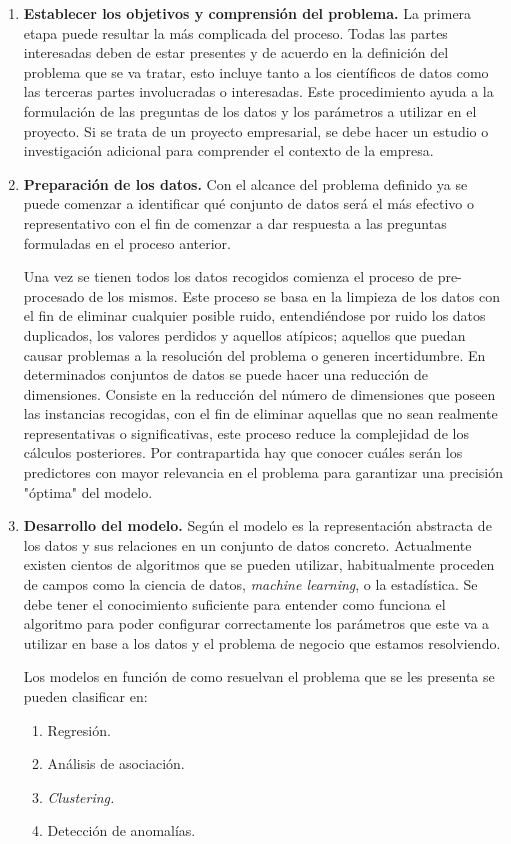 \begin{enumerate}
   \item \textbf{Establecer los objetivos y comprensión del problema.}
    La primera etapa puede resultar la más complicada del proceso. Todas las partes interesadas deben de estar presentes y de acuerdo en la definición del problema que se va tratar, esto incluye tanto a los científicos de datos como las terceras partes involucradas o interesadas. 
    Este procedimiento ayuda a la formulación de las preguntas de los datos y los parámetros a utilizar en el proyecto. Si se trata de un proyecto empresarial, se debe hacer un estudio o investigación adicional para comprender el contexto de la empresa.
    \item \textbf{Preparación de los datos.}
    Con el alcance del problema definido ya se puede comenzar a identificar qué conjunto de datos será el más efectivo o representativo con el fin de comenzar a dar respuesta a las preguntas formuladas en el proceso anterior.
    
    Una vez se tienen todos los datos recogidos comienza el proceso de pre-procesado de los mismos. Este proceso se basa en la limpieza de los datos con el fin de eliminar cualquier posible ruido, entendiéndose por ruido los datos duplicados, los valores perdidos y aquellos atípicos; aquellos que puedan causar problemas a la resolución del problema o generen incertidumbre.
    En determinados conjuntos de datos se puede hacer una reducción de dimensiones. Consiste en la reducción del número de dimensiones que poseen las instancias recogidas, con el fin de eliminar aquellas que no sean realmente representativas o significativas, este proceso reduce la complejidad de los cálculos posteriores. Por contrapartida hay que conocer cuáles serán los predictores con mayor relevancia en el problema para garantizar una precisión "óptima" del modelo.
    \item \textbf{Desarrollo del modelo.}
    Según \cite{KOTU201517} el modelo es la representación abstracta de los datos y sus relaciones en un conjunto de datos concreto. Actualmente existen cientos de algoritmos que se pueden utilizar, habitualmente proceden de campos como la ciencia de datos, \textit{machine learning}, o la estadística.
    Se debe tener el conocimiento suficiente para entender como funciona el algoritmo para poder configurar correctamente los parámetros que este va a utilizar en base a los datos y el problema de negocio que estamos resolviendo. 
    
    Los modelos en función de como resuelvan el problema que se les presenta se pueden clasificar en:
    \begin{enumerate}
        \item Regresión.
        \item Análisis de asociación.
        \item \textit{Clustering.}
        \item Detección de anomalías.
    \end{enumerate}
    

\end{enumerate}
